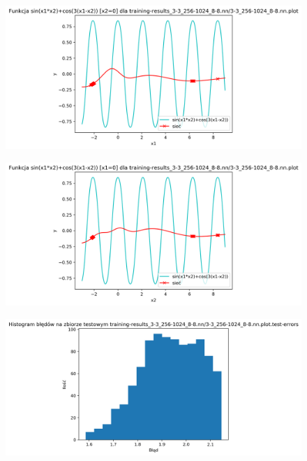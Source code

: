 \documentclass{classrep}
\begin{document}
{{\begin{figure}[!htbp]
            \end{figure}
            \FloatBarrier
            \begin{figure}[!htbp]
                \centering
                \includegraphics[width=135mm]{wykresy/3-3_256-1024_8-8_nn_plot1.png}
            \end{figure}
            \begin{figure}[!htbp]
                \centering
                \includegraphics[width=135mm]{wykresy/3-3_256-1024_8-8_nn_plot2.png}
            \end{figure}
            \begin{figure}[!htbp]
                \centering
                \includegraphics[width=145mm]{wykresy/3-3_256-1024_8-8_nn_plot_test-errors.png}

\end{figure}}}
\end{document}
